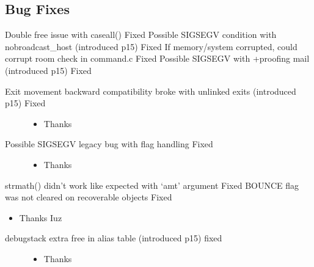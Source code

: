 \documentclass[letterpaper,10pt,english]{sphinxmanual}
\begin{document}
\subsection{Bug Fixes}
\label{\detokenize{changelog:id10}}
\sphinxAtStartPar
Double free issue with caseall() \sphinxhyphen{} Fixed
Possible SIGSEGV condition with nobroadcast\_host (introduced p15)  \sphinxhyphen{} Fixed
If memory/system corrupted, could corrupt room check in command.c \sphinxhyphen{} Fixed
Possible SIGSEGV with +proofing mail (introduced p15) \sphinxhyphen{} Fixed
\begin{description}
\item[{Exit movement backward compatibility broke with unlinked exits (introduced p15) \sphinxhyphen{} Fixed}] \leavevmode\begin{itemize}
\item {} 
\sphinxAtStartPar
Thanks 

\end{itemize}

\item[{Possible SIGSEGV legacy bug with flag handling \sphinxhyphen{} Fixed}] \leavevmode\begin{itemize}
\item {} 
\sphinxAtStartPar
Thanks 

\end{itemize}

\end{description}

\sphinxAtStartPar
strmath() didn’t work like expected with ‘amt’ argument \sphinxhyphen{} Fixed
BOUNCE flag was not cleared on recoverable objects \sphinxhyphen{} Fixed
\begin{itemize}
\item {} 
\sphinxAtStartPar
Thanks Iuz

\end{itemize}
\begin{description}
\item[{debugstack extra free in alias table (introduced p15) \sphinxhyphen{} fixed}] \leavevmode\begin{itemize}
\item {} 
\sphinxAtStartPar
Thanks 

\end{itemize}

\end{description}
\end{document}
